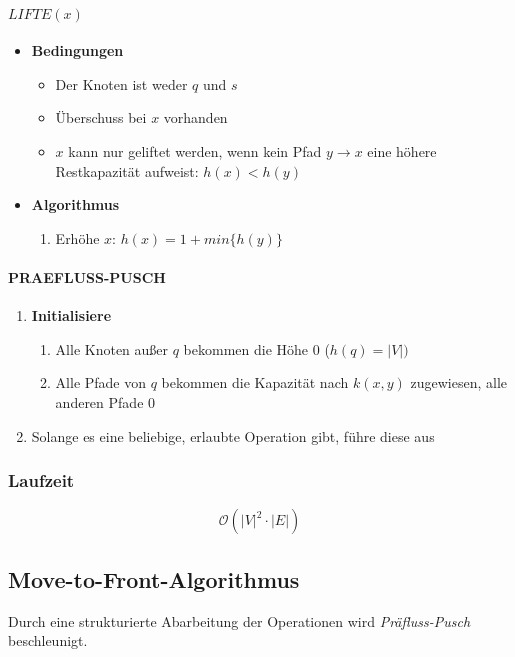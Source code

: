 \paragraph{\(LIFTE(x)\)}
\begin{itemize}
	\item \textbf{Bedingungen}
	\begin{itemize}
		\item Der Knoten ist weder \(q\) und \(s\)
		\item Überschuss bei \(x\) vorhanden
		\item \(x\) kann nur geliftet werden, wenn kein Pfad \(y \rightarrow x\) eine höhere Restkapazität aufweist: \(h(x) < h(y)\)
	\end{itemize}
	\item \textbf{Algorithmus}
	\begin{enumerate}
		\item Erhöhe \(x\): \(h(x) = 1 + min\{h(y)\}\)
	\end{enumerate}
\end{itemize}

\paragraph{PRAEFLUSS-PUSCH}
\begin{enumerate}
	\item \textbf{Initialisiere}
	\begin{enumerate}
		\item Alle Knoten außer \(q\) bekommen die Höhe \(0\) (\(h(q) = |V|)\)
		\item Alle Pfade von \(q\) bekommen die Kapazität nach \(k(x,y)\) zugewiesen, alle anderen Pfade \(0\)
	\end{enumerate}
	\item Solange es eine beliebige, erlaubte Operation gibt, führe diese aus
\end{enumerate}

\subsubsection{Laufzeit}
\[\mathcal{O} (|V|^2 \cdot |E|)\]


\subsection{Move-to-Front-Algorithmus}
Durch eine strukturierte Abarbeitung der Operationen wird \textit{Präfluss-Pusch} beschleunigt.

